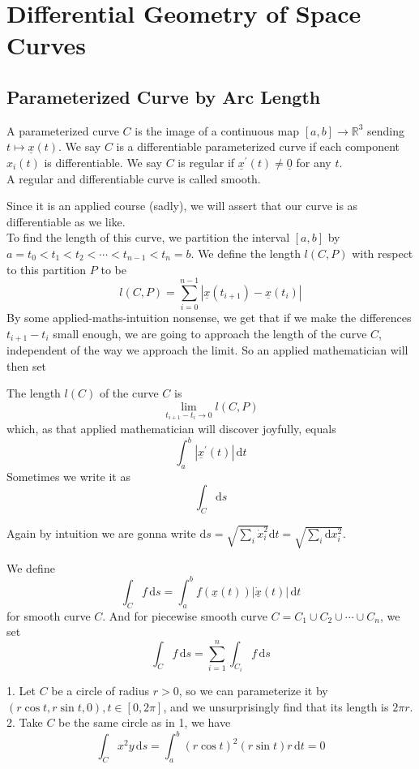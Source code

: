 \section{Differential Geometry of Space Curves}
\subsection{Parameterized Curve by Arc Length}
\begin{definition}
    A parameterized curve $C$ is the image of a continuous map $[a,b]\to \mathbb R^3$ sending $t\mapsto \underline{x}(t)$.
    We say $C$ is a differentiable parameterized curve if each component $x_i(t)$ is differentiable.
    We say $C$ is regular if $\underline{x}^\prime(t)\neq\underline{0}$ for any $t$.\\
    A regular and differentiable curve is called smooth.
\end{definition}
Since it is an applied course (sadly), we will assert that our curve is as differentiable as we like.\\
To find the length of this curve, we partition the interval $[a,b]$ by $a=t_0<t_1<t_2<\cdots <t_{n-1}<t_n=b$.
We define the length $l(C,P)$ with respect to this partition $P$ to be
$$l(C,P)=\sum_{i=0}^{n-1}|\underline{x}(t_{i+1})-\underline{x}(t_i)|$$
By some applied-maths-intuition nonsense, we get that if we make the differences $t_{i+1}-t_i$ small enough, we are going to approach the length of the curve $C$, independent of the way we approach the limit.
So an applied mathematician will then set
\begin{definition}
    The length $l(C)$ of the curve $C$ is
    $$\lim_{t_{i+1}-t_i\to 0}l(C,P)$$
    which, as that applied mathematician will discover joyfully, equals
    $$\int_{a}^b|\underline{x}^\prime(t)|\,\mathrm dt$$
    Sometimes we write it as
    $$\int_C\mathrm ds$$
\end{definition}
Again by intuition we are gonna write $\mathrm ds=\sqrt{\sum_i\dot{x}_i^2}\mathrm dt=\sqrt{\sum_i\mathrm dx_i^2}$.
\begin{definition}
    We define
    $$\int_Cf\,\mathrm ds=\int_a^bf(\underline{x}(t))|\underline{\dot{x}}(t)|\,\mathrm dt$$
    for smooth curve $C$.
    And for piecewise smooth curve $C=C_1\cup C_2\cup\cdots\cup C_n$, we set
    $$\int_Cf\,\mathrm ds=\sum_{i=1}^n\int_{C_i}f\,\mathrm ds$$
\end{definition}
\begin{example}
    1. Let $C$ be a circle of radius $r>0$, so we can parameterize it by $(r\cos t,r\sin t,0), t\in [0,2\pi]$, and we unsurprisingly find that its length is $2\pi r$.\\
    2. Take $C$ be the same circle as in 1, we have
    $$\int_C x^2y\,\mathrm ds=\int_a^b (r\cos t)^2(r\sin t) r\,\mathrm dt=0$$
\end{example}
